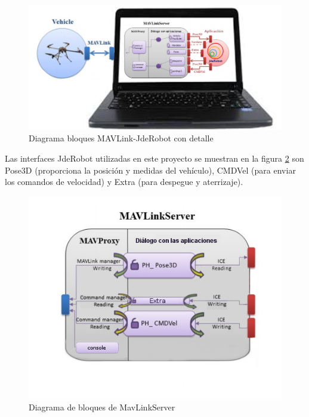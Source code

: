 \begin{figure}[H]
  \centering 
  \hspace*{-2.5cm}     
  \includegraphics[scale=0.45]{imagenes/cajaTransparente.png}
  \caption{Diagrama bloques MAVLink-JdeRobot con detalle}
  \label{fig:mavLinkJdeRobotTrasparente}
\end{figure}

Las interfaces JdeRobot utilizadas en este proyecto se muestran en la figura \ref{fig:MavProxyInside} son Pose3D (proporciona la posición y medidas del vehículo), CMDVel (para enviar los comandos de velocidad) y Extra (para despegue y aterrizaje).

\begin{figure}[H]
  \centering
  \includegraphics[scale=0.45]{imagenes/MavProxyPorDentro.png}
  \caption{Diagrama de bloques de MavLinkServer}
  \label{fig:MavProxyInside}
\end{figure}


